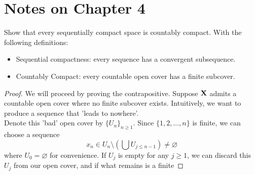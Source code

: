 \documentclass[../../main.tex]{subfiles}
\begin{document}
\providecommand{\szz}{\mathcal{S}}
\providecommand{\ccinf}{C_c^\infty}
\section*{Notes on Chapter 4}
\begin{wts}
    Show that every sequentially compact space is countably compact. With the following definitions:
    \begin{itemize}
    \item Sequential compactness: every sequence has a convergent subsequence.
    \item Countably Compact: every countable open cover has a finite subcover.
    \end{itemize}
\end{wts}

\begin{proof}
    We will proceed by proving the contrapositive. Suppose ${\mathbf{X}}$ admits a countable open cover where no finite subcover exists. Intuitively, we want to produce a sequence that 'leads to nowhere'.\\
    
    Denote this 'bad' open cover by $\{U_n\}_{n\geq 1}$. Since $\{1,2,\ldots,n\}$ is finite, we can choose a sequence 
    \[
        x_n\in U_n \setminus \left(\bigcup U_{j\leq n-1}\right)\neq\varnothing
    \]
    where $U_0=\varnothing$ for convenience.  If $U_j$ is empty for any $j\geq 1$, we can discard this $U_j$ from our open cover, and if what remains is a finite
\end{proof}\newpage
\end{document}
